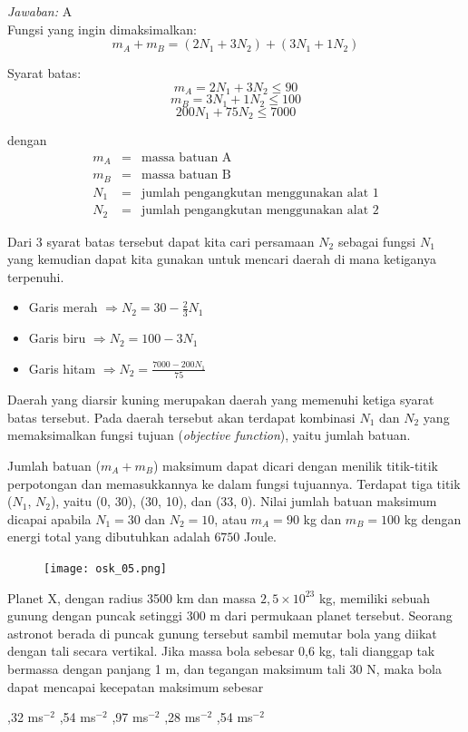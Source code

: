 \documentclass[11pt,fleqn]{exam}
\begin{document}
\begin{questions}
\textit{Jawaban: } A\\

Fungsi yang ingin dimaksimalkan:
$$m_A + m_B = (2N_1 + 3N_2) + (3N_1 + 1 N_2)$$

Syarat batas:
$$m_A = 2N_1 + 3N_2 \leq 90$$
$$m_B = 3N_1 + 1N_2 \leq 100$$
$$200 N_1 + 75 N_2 \leq 7000$$

dengan
\begin{eqnarray*}
m_A &=& \text{massa batuan A}\\
m_B &=& \text{massa batuan B}\\
N_1 &=& \text{jumlah pengangkutan menggunakan alat 1}\\
N_2 &=& \text{jumlah pengangkutan menggunakan alat 2}
\end{eqnarray*}

Dari 3 syarat batas tersebut dapat kita cari persamaan $N_2$ sebagai fungsi $N_1$ yang kemudian dapat kita gunakan untuk mencari daerah di mana ketiganya terpenuhi. 

\begin{itemize}
\item Garis merah $\Rightarrow N_2 = 30 - \frac{2}{3} N_1$
\item Garis biru $\Rightarrow N_2 = 100 - 3 N_1$
\item Garis hitam $\Rightarrow N_2 = \frac{7000 - 200 N_1}{75}$
\end{itemize}

Daerah yang diarsir kuning merupakan daerah yang memenuhi ketiga syarat batas tersebut. Pada daerah tersebut akan terdapat kombinasi $N_1$ dan $N_2$ yang memaksimalkan fungsi tujuan (\textit{objective function}), yaitu jumlah batuan. 

Jumlah batuan ($m_A + m_B$) maksimum dapat dicari dengan menilik titik-titik perpotongan dan memasukkannya ke dalam fungsi tujuannya. Terdapat tiga titik ($N_1$, $N_2$), yaitu (0, 30), (30, 10), dan (33, 0). Nilai jumlah batuan maksimum dicapai apabila $N_1 = 30$ dan $N_2 = 10$, atau $m_A = 90$ kg dan $m_B = 100$ kg dengan energi total yang dibutuhkan adalah $6750$ Joule.

\begin{figure}[!ht]
\centering
\texttt{[image: osk\_05.png]}
\end{figure}

\question Planet X, dengan radius 3500 km dan massa $2,5 \times 10^{23}$ kg, memiliki sebuah gunung dengan puncak setinggi 300 m dari permukaan planet tersebut. Seorang astronot berada di puncak gunung tersebut sambil memutar bola yang diikat dengan tali secara vertikal. Jika massa bola sebesar 0,6 kg, tali dianggap tak bermassa dengan panjang 1 m, dan tegangan maksimum tali 30 N, maka bola dapat mencapai kecepatan maksimum sebesar
\begin{choices}
,32 ms$^{-2}$
,54 ms$^{-2}$
,97 ms$^{-2}$
,28 ms$^{-2}$
,54 ms$^{-2}$
\end{choices}


\end{questions}
\end{document}
